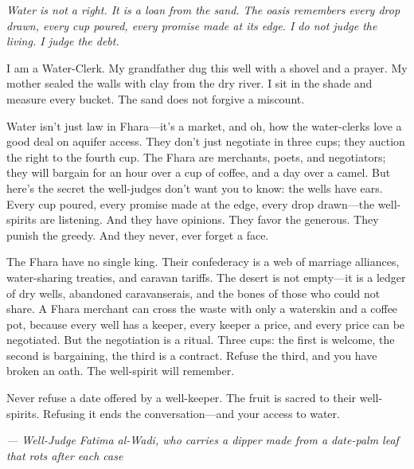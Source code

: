 \noindent
{\Large
\textit{Water is not a right. It is a loan from the sand. The oasis remembers every drop drawn, every cup poured, every promise made at its edge. I do not judge the living. I judge the debt.}

\vspace{0.5em}

I am a Water-Clerk. My grandfather dug this well with a shovel and a prayer. My mother sealed the walls with clay from the dry river. I sit in the shade and measure every bucket. The sand does not forgive a miscount.

\vspace{0.5em}

Water isn't just law in Fhara---it's a market, and oh, how the water-clerks love a good deal on aquifer access. They don't just negotiate in three cups; they auction the right to the fourth cup. The Fhara are merchants, poets, and negotiators; they will bargain for an hour over a cup of coffee, and a day over a camel. But here's the secret the well-judges don't want you to know: the wells have ears. Every cup poured, every promise made at the edge, every drop drawn---the well-spirits are listening. And they have opinions. They favor the generous. They punish the greedy. And they never, ever forget a face.

\vspace{0.5em}

The Fhara have no single king. Their confederacy is a web of marriage alliances, water-sharing treaties, and caravan tariffs. The desert is not empty---it is a ledger of dry wells, abandoned caravanserais, and the bones of those who could not share. A Fhara merchant can cross the waste with only a waterskin and a coffee pot, because every well has a keeper, every keeper a price, and every price can be negotiated. But the negotiation is a ritual. Three cups: the first is welcome, the second is bargaining, the third is a contract. Refuse the third, and you have broken an oath. The well-spirit will remember.

\vspace{0.5em}

Never refuse a date offered by a well-keeper. The fruit is sacred to their well-spirits. Refusing it ends the conversation---and your access to water.

\vspace{1em}

\noindent\textit{--- Well-Judge Fatima al-Wadi, who carries a dipper made from a date-palm leaf that rots after each case}
}

